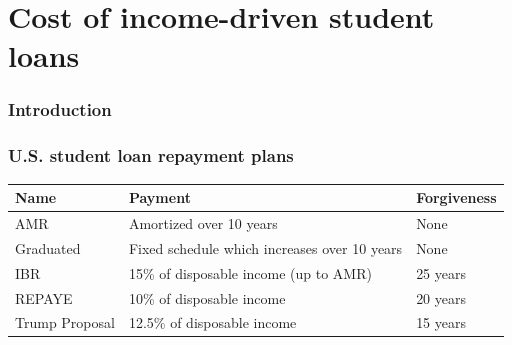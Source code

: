 \documentclass[10pt]{beamer}
\begin{document}
\section{Cost of income-driven student loans}


  \begin{frame} \frametitle{Introduction}


  \end{frame}

  \begin{frame} \frametitle{U.S. student loan repayment plans}

    \begin{table}
      {\small
      \hspace*{-0.5cm}\begin{tabular}{lll}
        \toprule
        \textbf{Name} & \textbf{Payment} & \textbf{Forgiveness} \\
        \midrule
        {\color{myred} AMR} & Amortized over 10 years & None \\
        {\color{myred} Graduated} & Fixed schedule which increases over 10 years & None \\
        {\color{mygreen} IBR} & 15\% of disposable income (up to AMR) & 25 years \\
        {\color{mygreen} REPAYE} & 10\% of disposable income & 20 years \\
        {\color{mygreen} Trump Proposal} & 12.5\% of disposable income & 15 years \\
        \bottomrule
      \end{tabular}
      }
    \end{table}

  \end{frame}
\end{document}

